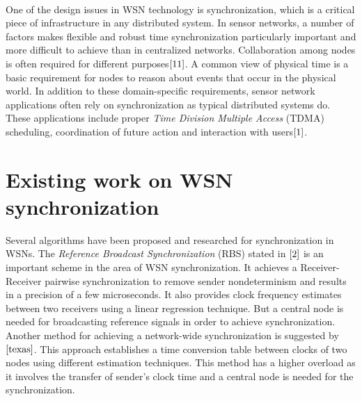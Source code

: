 \documentclass[a4paper,10pt]{report}
\begin{document}
\paragraph*{} One of the design issues in WSN technology is synchronization, which is a critical piece of infrastructure in any
distributed system. In sensor networks, a number of factors makes flexible and robust time synchronization particularly important and
more difficult to achieve than in centralized networks. Collaboration among nodes is often required for different purposes$\cite{11}$. A common view of physical time is a basic requirement for nodes to reason about events that occur in the physical world. In addition to these domain-specific requirements, sensor network applications often rely on synchronization as typical distributed systems do. These applications include proper \textit{Time Division Multiple Access} (TDMA) scheduling, coordination of future action and interaction with users$\cite{1}$.
\section{\textbf{Existing work on WSN synchronization}}\par
Several algorithms have been proposed and researched for synchronization in WSNs. The \textit{Reference Broadcast
Synchronization} (RBS) stated in $\cite{2}$ is an important scheme in the
area of WSN synchronization. It achieves a Receiver-Receiver
pairwise synchronization to remove sender nondeterminism and results
in a precision of a few microseconds. It also provides clock
frequency estimates between two receivers using a linear regression
technique. But a central node is needed for broadcasting reference
signals in order to achieve synchronization. Another method for
achieving a network-wide synchronization is suggested by
$\cite{texas}$. This approach establishes a time conversion table
between clocks of two nodes using different estimation techniques.
This method has a higher overload as it involves the transfer of
sender's clock time and a central node is needed for the
synchronization.
\end{document}
